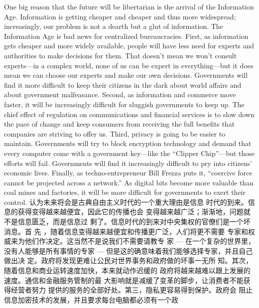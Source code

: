 \begin{paracol}{2}
One big reason that the future will be libertarian is the arrival
of the Information Age. Information is getting cheaper and
cheaper and thus more widespread; increasingly, our problem is
not a dearth but a glut of information. The Information Age is
bad news for centralized bureaucracies. First, as information
gets cheaper and more widely available, people will have less
need for experts and authorities to make decisions for them.
That doesn't mean we won't consult experts---in a complex
world, none of us can be expert in everything---but it does
mean we can choose our experts and make our own decisions.
Governments will find it more difficult to keep their citizens in
the dark about world affairs and about government malfeasance. Second, as information and commerce move faster, it will
be increasingly difficult for sluggish governments to keep up.
The chief effect of regulation on communications and financial
services is to slow down the pace of change and keep consumers
from receiving the full benefits that companies are striving to
offer us. Third, privacy is going to be easier to maintain. Governments will try to block encryption technology and demand
that every computer come with a government key---like the
``Clipper Chip''---but those efforts will fail. Governments will
find it increasingly difficult to pry into citizens' economic lives.
Finally, as techno-entrepreneur Bill Frezza puts it, ``coercive
force cannot be projected across a network.'' As digital bits become more valuable than coal mines and factories, it will be
more difficult for governments to exert their control.
\switchcolumn
认为未来将会是古典自由主义时代的一个重大理由是信息
时代的到来。信息的获得变得越来越便宜，因此它的传播也会
变得越来越广泛；渐渐地，问题就不是信息匮乏，而是信息过
剩了。信息时代的到来对中央集权的官僚们是一个坏消息。首
先 ，随着信息变得越来越便宜和传播更广泛，人们将更不需要
专家和权威来为他们作决定。这当然不是说我们不需要请教专
家 --- 在一个复杂的世界里，没有人能够是所有事情的专家
--- 但是这的确意味着我们能够选择专家，并且自己做出决
定。政府将发现更难让公民对世界事务和政府做的坏事一无所
知。其次，随着信息和商业运转速度加快，本来就动作迟缓的
政府将越来越难以跟上发展的速度。通信和金融服务管制的最
大影响就是减缓了变革的脚步，让消费者不能获得经营者努力
提供的服务的全部好处。第三，隐私更容易得到保护。政府会
阻止信息加密技术的发展，并且要求每台电脑都必须有一个政

\end{paracol}
